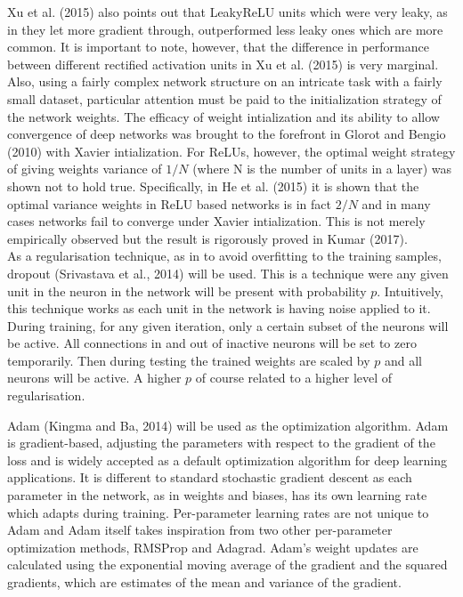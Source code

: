 \documentclass{article}
\begin{document}
Xu et al. (2015) also points out that LeakyReLU units which were very leaky, as in they let more gradient through, outperformed less leaky ones which are more common. It is important to note, however, that the difference in performance between different rectified activation units in Xu et al. (2015) is very marginal.\\

Also, using a fairly complex network structure on an intricate task with a fairly small dataset, particular attention must be paid to the initialization strategy of the network weights. The efficacy of weight intialization and its ability to allow convergence of deep networks was brought to the forefront in Glorot and Bengio (2010) with Xavier intialization. For ReLUs, however, the optimal weight strategy of giving weights variance of $1/N$ (where N is the number of units in a layer) was shown not to hold true. Specifically, in He et al. (2015) it is shown that the optimal variance weights in ReLU based networks is in fact $2/N$ and in many cases networks fail to converge under Xavier intialization. This is not merely empirically observed but the result is rigorously proved in Kumar (2017).\\

As a regularisation technique, as in to avoid overfitting to the training samples, dropout (Srivastava et al., 2014) will be used. This is a technique were any given unit in the neuron in the network will be present with probability $p$. Intuitively, this technique works as each unit in the network is having noise applied to it. During training, for any given iteration, only a certain subset of the neurons will be active. All connections in and out of inactive neurons will be set to zero temporarily. Then during testing the trained weights are scaled by $p$ and all neurons will be active. A higher $p$ of course related to a higher level of regularisation.

Adam (Kingma and Ba, 2014) will be used as the optimization algorithm. Adam is gradient-based, adjusting the parameters with respect to the gradient of the loss and is widely accepted as a default optimization algorithm for deep learning applications. It is different to standard stochastic gradient descent as each parameter in the network, as in weights and biases, has its own learning rate which adapts during training. Per-parameter learning rates are not unique to Adam and Adam itself takes inspiration from two other per-parameter optimization methods, RMSProp and Adagrad. Adam's weight updates are calculated using the exponential moving average of the gradient and the squared gradients, which are estimates of the mean and variance of the gradient. \\
\end{document}
